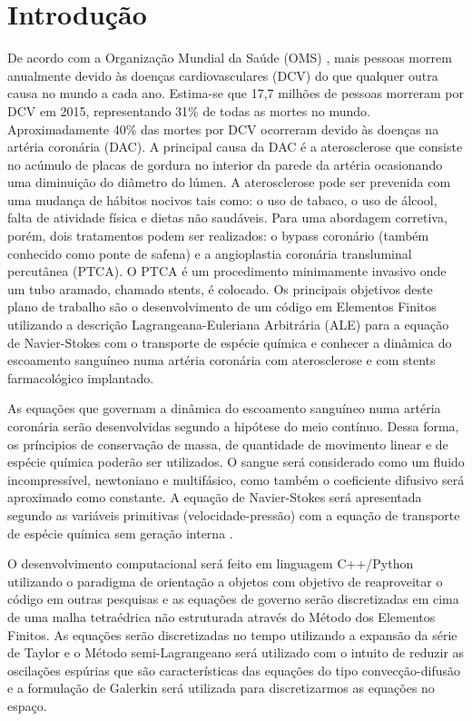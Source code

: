 \section{Introdução}

De acordo com a Organização Mundial da Saúde (OMS) \cite{oms}, mais pessoas morrem anualmente devido às doenças cardiovasculares (DCV) do que qualquer outra causa no mundo a cada ano. 
Estima-se que 17,7 milhões de pessoas morreram por DCV em 2015, representando 31\% de todas as mortes no mundo. 
Aproximadamente 40\% das mortes por DCV ocorreram devido às doenças na artéria coronária (DAC). 
A principal causa da DAC é a aterosclerose que consiste no acúmulo de placas de gordura no interior da parede da artéria ocasionando uma diminuição do diâmetro do lúmen. 
A aterosclerose pode ser prevenida com uma mudança de hábitos nocivos tais como: o uso de tabaco, o uso de álcool, falta de atividade física e dietas não saudáveis. \cite{site oms habitos} 
Para uma abordagem corretiva, porém, dois tratamentos podem ser realizados: o bypass coronário (também conhecido como ponte de safena) e a angioplastia coronária transluminal percutânea (PTCA). 
O PTCA é um procedimento minimamente invasivo onde um tubo aramado, chamado stents, é colocado. \cite{ref review PTCA}
Os principais objetivos deste plano de trabalho são o desenvolvimento de um código em Elementos Finitos utilizando a descrição Lagrangeana-Euleriana Arbitrária (ALE) \cite{donea2004} para a equação de Navier-Stokes com o transporte de espécie química e 
conhecer a dinâmica do escoamento sanguíneo numa artéria coronária com aterosclerose e com stents farmacológico implantado.

\medskip
As equações que governam a dinâmica do escoamento sanguíneo numa artéria coronária serão desenvolvidas segundo a hipótese do meio contínuo. 
Dessa forma, os príncipios de conservação de massa, de quantidade de movimento linear e de espécie química poderão ser utilizados. 
O sangue será considerado como um fluido incompressível, newtoniano e multifásico, como também o coeficiente difusivo será aproximado como constante. 
A equação de Navier-Stokes será apresentada segundo as variáveis primitivas (velocidade-pressão) com a equação de transporte de espécie química sem geração interna \cite{batchelor1967}.
 
\medskip
O desenvolvimento computacional será feito em linguagem C++/Python \cite{c++} \cite{python} utilizando o paradigma de orientação a objetos com objetivo de reaproveitar o código em outras pesquisas e 
as equações de governo serão discretizadas em cima de uma malha tetraédrica não estruturada através do Método dos Elementos Finitos. 
As equações serão discretizadas no tempo utilizando a expansão da série de Taylor e 
o Método semi-Lagrangeano \cite{pironneau1982} será utilizado com o intuito de reduzir as oscilações espúrias que são características das equações do tipo convecção-difusão e 
a formulação de Galerkin \cite{zienkiewicz1965} será utilizada para discretizarmos as equações no espaço. 
 
